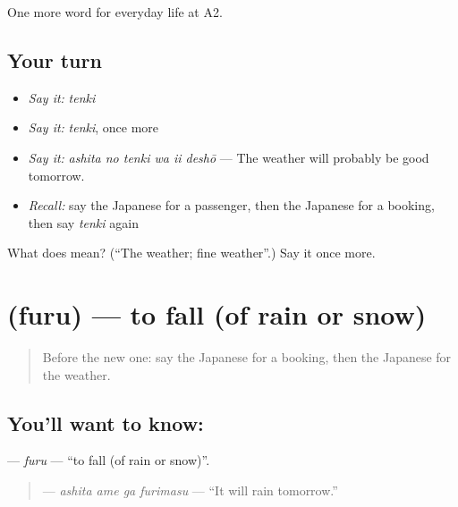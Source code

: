 \begin{grammarlens}[title={What you've built}]
One more word for everyday life at A2.
\end{grammarlens}

\subsection*{Your turn}
\begin{itemize}
\raggedright
  \item \emph{Say it:} \emph{tenki}
  \item \emph{Say it:} \emph{tenki}, once more
  \item \emph{Say it:} \emph{ashita no tenki wa ii deshō} — The weather will probably be good tomorrow.
  \item \emph{Recall:} say the Japanese for a passenger, then the Japanese for a booking, then say \emph{tenki} again
\end{itemize}

\begin{tcolorbox}[breakable,colback=teal!4,colframe=teal!35!black,title={Before you move on}]
What does  mean? (\textquotedblleft{}The weather; fine weather\textquotedblright{}.) Say it once more.
\end{tcolorbox}
\section[\texorpdfstring{\ja{ふる} (furu)}{ふる (furu)}]{ (furu) — to fall (of rain or snow)}

\label{lesson:JA-C207-furu}



\begin{quote}
Before the new one: say the Japanese for a booking, then the Japanese for the weather.
\end{quote}

\subsection*{You'll want to know: }
\textbf{} — \emph{furu} — \textquotedblleft{}to fall (of rain or snow)\textquotedblright{}.

\begin{quote}
\textbf{  } — \emph{ashita ame ga furimasu} — \textquotedblleft{}It will rain tomorrow.\textquotedblright{}
\end{quote}

